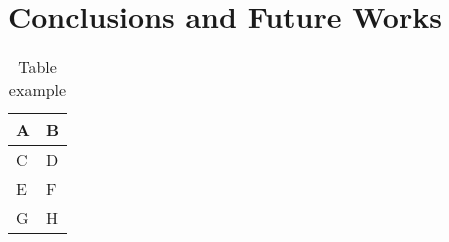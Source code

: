 
\chapter{Conclusions and Future Works}
\label{chp:conclusions}

\begin{table}[ht]
    \centering
    \begin{tabular}{|l|l|}
    \hline
    \textbf{A} & \textbf{B} \\ \hline
    C          & D          \\ \hline
    E          & F          \\ \hline
    G          & H          \\ \hline
    \end{tabular}
    \caption{Table example \label{tab:table-name}}
\end{table}